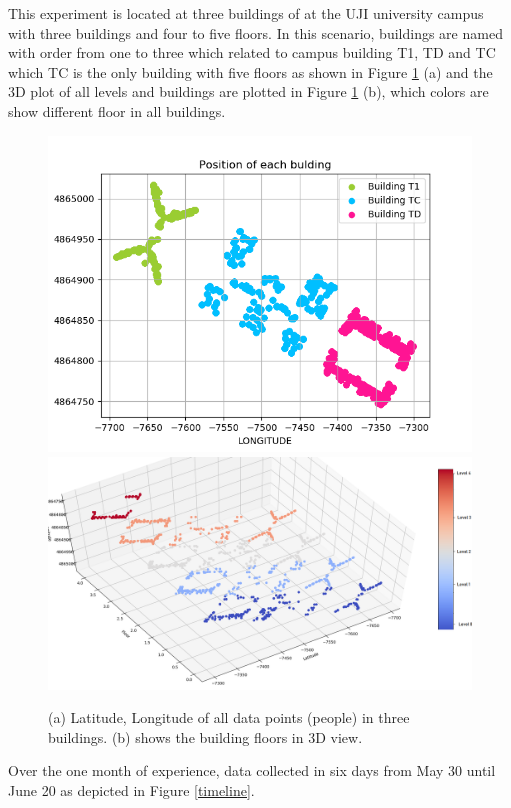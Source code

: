 This experiment is located at three buildings of at the UJI university campus with three buildings and four to five floors. In this scenario, buildings are named with order from one to three which related to campus building T1, TD and TC which TC is the only building with five floors as shown in Figure \ref{nama} (a) and the 3D plot of all levels and buildings are plotted in Figure \ref{nama} (b), which colors are show different floor in all buildings. 

\begin{figure}[!h]
    \centering
    \includegraphics[width = 7 cm]{image/Chapters/Chapter6/LatLong.png}\hfill
    \includegraphics[width = 8 cm]{image/Chapters/Chapter6/LatLongFloor.png}
    \\[\smallskipamount]    
    \caption{(a) Latitude, Longitude of all data points (people) in three buildings. (b) shows the building floors in 3D view.}
    \label{nama}
\end{figure}


Over the one month of experience, data collected in six days from May 30 until June 20 as depicted in Figure \ref{timeline}. 



